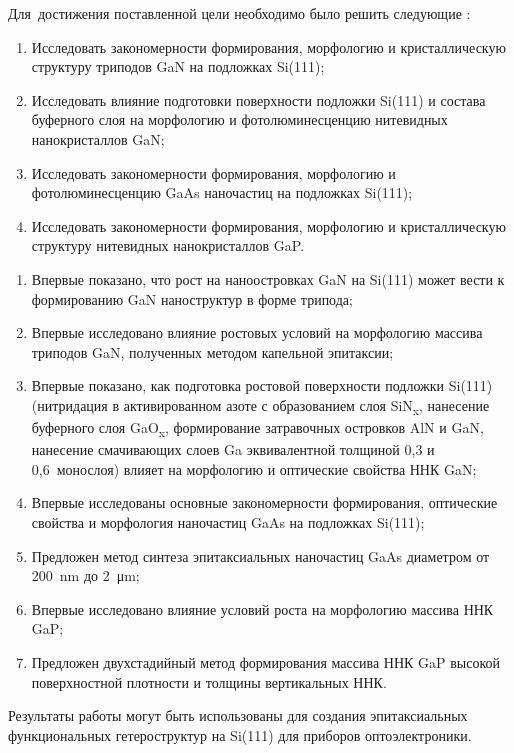 Для~достижения поставленной цели необходимо было решить следующие {\tasks}:
\begin{enumerate}[beginpenalty=10000] %
  \item	Исследовать закономерности формирования, морфологию и кристаллическую структуру триподов GaN на подложках Si(111);
  \item	Исследовать влияние подготовки поверхности подложки Si(111) и состава буферного слоя на морфологию и фотолюминесценцию нитевидных нанокристаллов GaN;
  \item Исследовать закономерности формирования, морфологию и фотолюминесценцию GaAs наночастиц на подложках Si(111);
  \item Исследовать закономерности формирования, морфологию и кристаллическую структуру нитевидных нанокристаллов GaP.
\end{enumerate}


{\novelty}
\begin{enumerate}[beginpenalty=10000] %
  \item Впервые показано, что рост на наноостровках GaN на Si(111) может вести к формированию GaN наноструктур в форме трипода;
  \item Впервые исследовано влияние ростовых условий на морфологию массива триподов GaN, полученных методом капельной эпитаксии;
  \item Впервые показано, как подготовка ростовой поверхности подложки Si(111) (нитридация в активированном азоте с образованием слоя SiN\textsubscript{x}, нанесение буферного слоя GaO\textsubscript{x}, формирование затравочных островков AlN и GaN, нанесение смачивающих слоев Ga эквивалентной толщиной 0,3 и 0,6~монослоя) влияет на морфологию и оптические свойства ННК GaN;
  \item	Впервые исследованы основные закономерности формирования, оптические свойства и морфология наночастиц GaAs на подложках Si(111);
  \item	Предложен метод синтеза эпитаксиальных наночастиц GaAs диаметром от 200~\si{\nano\meter} до 2~\si{\micro\metre};
  \item	Впервые исследовано влияние условий роста на морфологию массива ННК GaP;
  \item Предложен двухстадийный метод формирования массива ННК GaP высокой поверхностной плотности и толщины вертикальных ННК.
\end{enumerate}

{\influence} Результаты работы могут быть использованы для создания эпитаксиальных функциональных гетероструктур на Si(111) для приборов оптоэлектроники.


